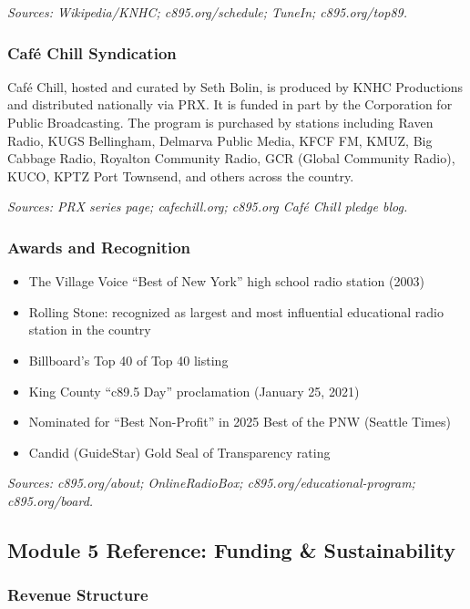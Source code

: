 \documentclass[11pt,letterpaper]{article}
\begin{document}
\textit{Sources: Wikipedia/KNHC; c895.org/schedule; TuneIn; c895.org/top89.}

\subsubsection{Café Chill Syndication}

Café Chill, hosted and curated by Seth Bolin, is produced by KNHC Productions and distributed nationally via PRX. It is funded in part by the Corporation for Public Broadcasting. The program is purchased by stations including Raven Radio, KUGS Bellingham, Delmarva Public Media, KFCF FM, KMUZ, Big Cabbage Radio, Royalton Community Radio, GCR (Global Community Radio), KUCO, KPTZ Port Townsend, and others across the country.

\textit{Sources: PRX series page; cafechill.org; c895.org Café Chill pledge blog.}

\subsubsection{Awards and Recognition}

\begin{itemize}[leftmargin=2em]
\item The Village Voice ``Best of New York'' high school radio station (2003)
\item Rolling Stone: recognized as largest and most influential educational radio station in the country
\item Billboard's Top 40 of Top 40 listing
\item King County ``c89.5 Day'' proclamation (January 25, 2021)
\item Nominated for ``Best Non-Profit'' in 2025 Best of the PNW (Seattle Times)
\item Candid (GuideStar) Gold Seal of Transparency rating
\end{itemize}

\textit{Sources: c895.org/about; OnlineRadioBox; c895.org/educational-program; c895.org/board.}

\subsection{Module 5 Reference: Funding \& Sustainability}

\subsubsection{Revenue Structure}
\end{document}
